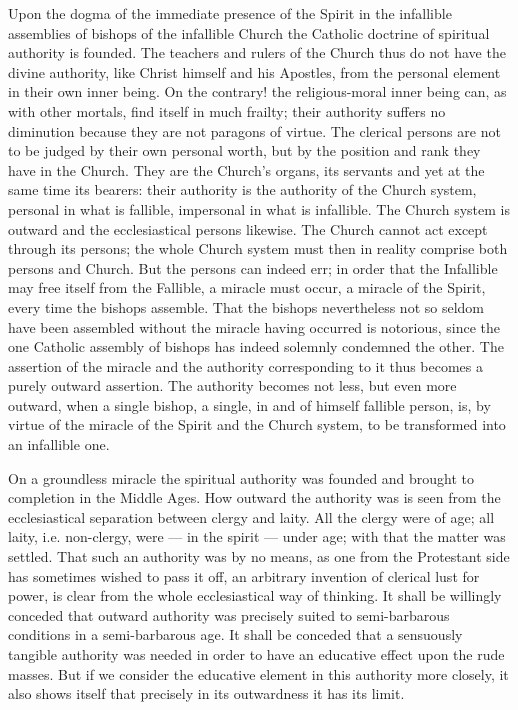 \documentclass[12pt,a4paper,openany]{book}
\newcommand{\opage}[1]{\marginnote{\footnotesize\textit{[#1]}}}
\begin{document}
Upon the dogma of the immediate presence of the Spirit
in the infallible assemblies of bishops of the infallible Church
the Catholic doctrine of spiritual authority is founded.
The teachers and rulers of the Church thus do not have the
divine authority, like Christ himself
and his Apostles, from the personal element in their own inner being.
On the contrary! the religious-moral inner being can, as with
other mortals, find itself in much frailty;
\setcounter{footnote}{0}%
\opage{75}their authority suffers no diminution because they are not
paragons of virtue. The clerical persons are not to be judged
by their own personal worth, but by
the position and rank they have in the Church. They are the Church's
organs, its servants and yet at the same time its bearers:
their authority is the authority of the Church system, personal
in what is fallible, impersonal in what is infallible. The Church system
is outward and the ecclesiastical persons likewise.
The Church cannot act except through its persons;
the whole Church system must then in reality comprise
both persons and Church. But the persons can indeed
err; in order that the Infallible may free itself from the Fallible,
a miracle must occur, a miracle of the Spirit,
every time the bishops assemble. That the bishops nevertheless not
so seldom have been assembled without the miracle having
occurred is notorious, since the one Catholic assembly of bishops
has indeed solemnly condemned the other. The assertion
of the miracle and the authority corresponding to it
thus becomes a purely outward assertion. The authority
becomes not less, but even more outward, when
a single bishop, a single, in and of himself fallible person,
is, by virtue of the miracle of the Spirit and the Church system,
to be transformed into an infallible one.

On a groundless miracle the spiritual authority was
founded and brought to completion in the Middle Ages.
How outward the authority was is seen from the
ecclesiastical separation between clergy and laity. All
the clergy were of age; all laity, i.e. non-clergy,
were --- in the spirit --- under age; with that the
matter was settled. That such an authority was by no means,
as one from the Protestant side has sometimes
wished to pass it off, an arbitrary invention of clerical
\setcounter{footnote}{0}%
\opage{76}lust for power, is clear from the whole ecclesiastical way of thinking.
It shall be willingly conceded that outward authority was precisely
suited to semi-barbarous conditions in a semi-barbarous
age. It shall be conceded that a sensuously tangible authority
was needed in order to have an educative effect
upon the rude masses. But if we consider the
educative element in this authority more closely, it also
shows itself that precisely in its outwardness it has its
limit.
\end{document}
